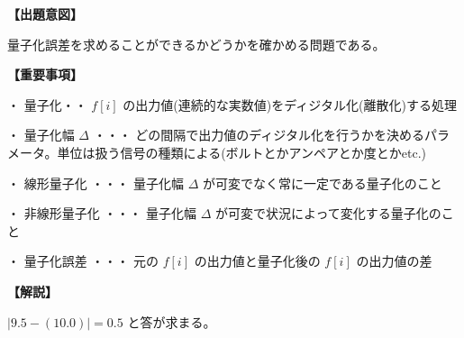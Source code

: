 \noindent \textbf{【出題意図】}

\noindent 量子化誤差を求めることができるかどうかを確かめる問題である。

\vspace{1em}
\noindent \textbf{【重要事項】}

\medskip
\noindent ・ 量子化・・ $f[i]$ の出力値(連続的な実数値)をディジタル化(離散化)する処理

\medskip
\noindent ・ 量子化幅 $\Delta$ ・・・ どの間隔で出力値のディジタル化を行うかを決めるパラメータ。単位は扱う信号の種類による(ボルトとかアンペアとか度とかetc.)

\medskip
\noindent ・ 線形量子化 ・・・ 量子化幅  $\Delta$ が可変でなく常に一定である量子化のこと

\medskip
\noindent ・ 非線形量子化 ・・・ 量子化幅  $\Delta$ が可変で状況によって変化する量子化のこと

\medskip
\noindent ・ 量子化誤差 ・・・ 元の $f[i]$ の出力値と量子化後の $f[i]$ の出力値の差

\vspace{1em}
\noindent \textbf{【解説】}

\noindent $|9.5 - (10.0)| =0.5$ と答が求まる。
